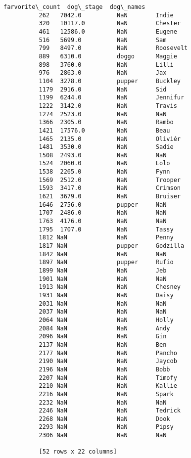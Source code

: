 \documentclass[11pt]{article}
\begin{document}
\begin{Verbatim}[commandchars=\\\{\}]
               farvorite\_count  dog\_stage  dog\_names  
          262   7042.0          NaN        Indie      
          320   10117.0         NaN        Chester    
          461   12586.0         NaN        Eugene     
          516   5699.0          NaN        Sam        
          799   8497.0          NaN        Roosevelt  
          889   6310.0          doggo      Maggie     
          898   3760.0          NaN        Lilli      
          976   2863.0          NaN        Jax        
          1104  3278.0          pupper     Buckley    
          1179  2916.0          NaN        Sid        
          1199  6244.0          NaN        Jennifur   
          1222  3142.0          NaN        Travis     
          1274  2523.0          NaN        NaN        
          1366  2305.0          NaN        Rambo      
          1421  17576.0         NaN        Beau       
          1465  2135.0          NaN        Oliviér    
          1481  3530.0          NaN        Sadie      
          1508  2493.0          NaN        NaN        
          1524  2060.0          NaN        Lolo       
          1538  2265.0          NaN        Fynn       
          1569  2512.0          NaN        Trooper    
          1593  3417.0          NaN        Crimson    
          1621  3679.0          NaN        Bruiser    
          1646  2756.0          pupper     NaN        
          1707  2486.0          NaN        NaN        
          1763  4176.0          NaN        NaN        
          1795  1707.0          NaN        Tassy      
          1812 NaN              NaN        Penny      
          1817 NaN              pupper     Godzilla   
          1842 NaN              NaN        NaN        
          1897 NaN              pupper     Rufio      
          1899 NaN              NaN        Jeb        
          1901 NaN              NaN        NaN        
          1913 NaN              NaN        Chesney    
          1931 NaN              NaN        Daisy      
          2031 NaN              NaN        NaN        
          2037 NaN              NaN        NaN        
          2064 NaN              NaN        Holly      
          2084 NaN              NaN        Andy       
          2096 NaN              NaN        Gin        
          2137 NaN              NaN        Ben        
          2177 NaN              NaN        Pancho     
          2190 NaN              NaN        Jaycob     
          2196 NaN              NaN        Bobb       
          2207 NaN              NaN        Timofy     
          2210 NaN              NaN        Kallie     
          2216 NaN              NaN        Spark      
          2232 NaN              NaN        NaN        
          2246 NaN              NaN        Tedrick    
          2268 NaN              NaN        Dook       
          2293 NaN              NaN        Pipsy      
          2306 NaN              NaN        NaN        
          
          [52 rows x 22 columns]
\end{Verbatim}
            
\end{document}
